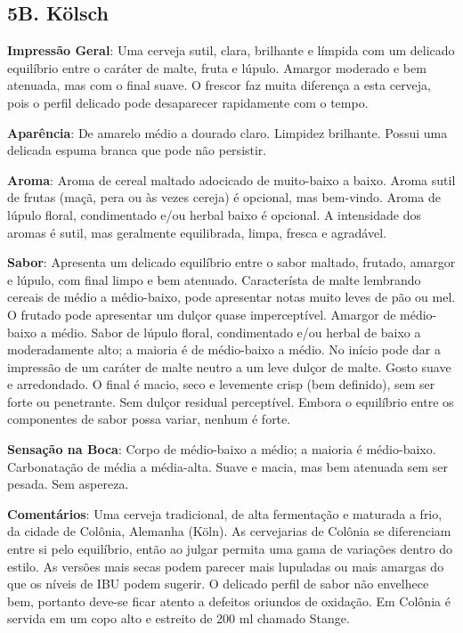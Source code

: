 \subsection*{5B. Kölsch}
\textbf{Impressão Geral}: Uma cerveja sutil, clara, brilhante e límpida com um delicado equilíbrio entre o caráter de malte, fruta e lúpulo. Amargor moderado e bem atenuada, mas com o final suave. O frescor faz muita diferença a esta cerveja, pois o perfil delicado pode desaparecer rapidamente com o tempo.

\textbf{Aparência}: De amarelo médio a dourado claro. Limpidez brilhante. Possui uma delicada espuma branca que pode não persistir.

\textbf{Aroma}: Aroma de cereal maltado adocicado de muito-baixo a baixo. Aroma sutil de frutas (maçã, pera ou às vezes cereja) é opcional, mas bem-vindo. Aroma de lúpulo floral, condimentado e/ou herbal baixo é opcional. A intensidade dos aromas é sutil, mas geralmente equilibrada, limpa, fresca e agradável.

\textbf{Sabor}: Apresenta um delicado equilíbrio entre o sabor maltado, frutado, amargor e lúpulo, com final limpo e bem atenuado. Característa de malte lembrando cereais de médio a médio-baixo, pode apresentar notas muito leves de pão ou mel. O frutado pode apresentar um dulçor quase imperceptível. Amargor de médio-baixo a médio. Sabor de lúpulo floral, condimentado e/ou herbal de baixo a moderadamente alto; a maioria é de médio-baixo a médio. No início pode dar a impressão de um caráter de malte neutro a um leve dulçor de malte. Gosto suave e arredondado. O final é macio, seco e levemente crisp (bem definido), sem ser forte ou penetrante. Sem dulçor residual perceptível. Embora o equilíbrio entre os componentes de sabor possa variar, nenhum é forte.

\textbf{Sensação na Boca}: Corpo de médio-baixo a médio; a maioria é médio-baixo. Carbonatação de média a média-alta. Suave e macia, mas bem atenuada sem ser pesada. Sem aspereza.

\textbf{Comentários}: Uma cerveja tradicional, de alta fermentação e maturada a frio, da cidade de Colônia, Alemanha (Köln). As cervejarias de Colônia se diferenciam entre si pelo equilíbrio, então ao julgar permita uma gama de variações dentro do estilo. As versões mais secas podem parecer mais lupuladas ou mais amargas do que os níveis de IBU podem sugerir. O delicado perfil de sabor não envelhece bem, portanto deve-se ficar atento a defeitos oriundos de oxidação. Em Colônia é servida em um copo alto e estreito de 200 ml chamado Stange.

